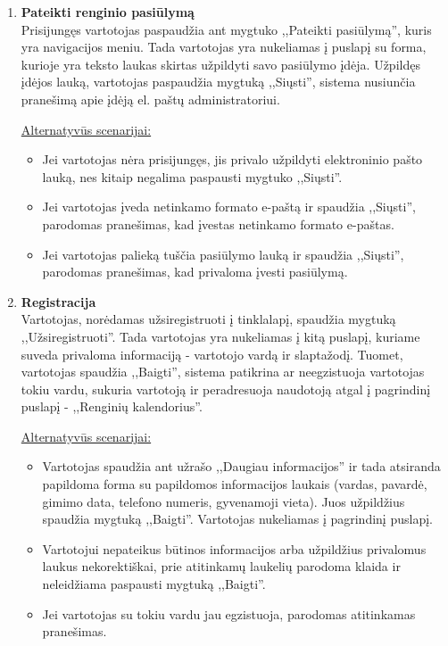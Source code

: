 \documentclass{VUMIFPSkursinis}
\begin{document}
\begin{enumerate} [label = \textbf{U\arabic*.}]
			\item \textbf{Pateikti renginio pasiūlymą} \\
					Prisijungęs vartotojas paspaudžia ant mygtuko ,,Pateikti pasiūlymą'', kuris yra navigacijos meniu. Tada vartotojas yra nukeliamas į puslapį su forma, kurioje yra teksto laukas skirtas užpildyti savo pasiūlymo įdėja. Užpildęs įdėjos lauką, vartotojas paspaudžia mygtuką ,,Siųsti'', sistema nusiunčia pranešimą apie įdėją el. paštų administratoriui.
							
					\underline{Alternatyvūs scenarijai:}
					\begin{itemize}
						\item Jei vartotojas nėra prisijungęs, jis privalo užpildyti elektroninio pašto lauką, nes kitaip negalima paspausti mygtuko ,,Siųsti''.
						\item Jei vartotojas įveda netinkamo formato e-paštą ir spaudžia ,,Siųsti'', parodomas pranešimas, kad įvestas netinkamo formato e-paštas.
						\item Jei vartotojas palieką tuščia pasiūlymo lauką ir spaudžia ,,Siųsti'', parodomas pranešimas, kad privaloma įvesti pasiūlymą.
					\end{itemize}
				
			\item \textbf{Registracija} \\
					Vartotojas, norėdamas užsiregistruoti į tinklalapį, spaudžia mygtuką ,,Užsiregistruoti''. Tada vartotojas yra nukeliamas į kitą puslapį, kuriame suveda privaloma informaciją - vartotojo vardą ir slaptažodį. Tuomet, vartotojas spaudžia ,,Baigti'', sistema patikrina ar neegzistuoja vartotojas tokiu vardu, sukuria vartotoją ir peradresuoja naudotoją atgal į pagrindinį puslapį - ,,Renginių kalendorius''.
							
					\underline{Alternatyvūs scenarijai:}
					\begin{itemize}
						\item Vartotojas spaudžia ant užrašo ,,Daugiau informacijos'' ir tada atsiranda papildoma forma su papildomos informacijos laukais (vardas, pavardė, gimimo data, telefono numeris, gyvenamoji vieta). Juos užpildžius spaudžia mygtuką ,,Baigti''. Vartotojas nukeliamas į pagrindinį puslapį.
						\item Vartotojui nepateikus būtinos informacijos arba užpildžius privalomus laukus nekorektiškai, prie atitinkamų laukelių parodoma klaida ir neleidžiama paspausti mygtuką ,,Baigti''.
						\item Jei vartotojas su tokiu vardu jau egzistuoja, parodomas atitinkamas pranešimas.
					\end{itemize}


\end{enumerate}
\end{document}
